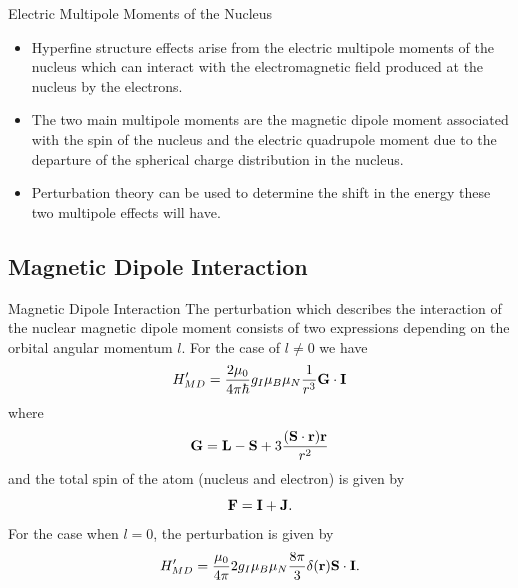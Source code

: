 \documentclass[xcolor=dvipsnames,t]{beamer}
\begin{document}
\begin{frame}{Electric Multipole Moments of the Nucleus} 
\begin{itemize} 
    \item    Hyperfine structure effects arise from the electric multipole moments of the 
    nucleus which can interact with the electromagnetic field produced at the 
    nucleus by the electrons. 
    \item The two main multipole moments are the magnetic 
    dipole moment associated with the spin of the nucleus and the electric quadrupole
    moment due to the departure of the spherical charge distribution in the nucleus.
    \item Perturbation theory can be used to determine the shift in the energy these
    two multipole effects will have.
\end{itemize} 
\end{frame} 
       
    \subsection{Magnetic Dipole Interaction}
    \begin{frame}{Magnetic Dipole Interaction} 
    The perturbation which describes the interaction of the nuclear magnetic dipole 
    moment consists of two expressions depending on the orbital angular momentum $l$.
    For the case of $l \neq 0$ we have
    \begin{equation}
        H'_{MD} = \frac{2\mu_0}{4 \pi \hbar} g_I \mu_B \mu_N \frac{1}{r^3}
                   {\bf G} \cdot {\bf I}
    \end{equation}
    where
    \begin{equation}
        {\bf G} = {\bf L} - {\bf S} + 3 \frac{({\bf S} \cdot {\bf r}) {\bf r}}{r^2}
    \end{equation}
    and the total spin of the atom (nucleus and electron) is given by
    \begin{equation}
        {\bf F} = {\bf I} + {\bf J}.
    \end{equation}
    For the case when $l = 0$, the perturbation is given by
    \begin{equation}
        H'_{MD}  =  \frac{\mu_0}{4\pi} 2g_I \mu_B \mu_N \frac{8 \pi}{3} 
               \delta({\bf r}) {\bf S} \cdot {\bf I}.
    \end{equation}
    \end{frame} 
\end{document}
